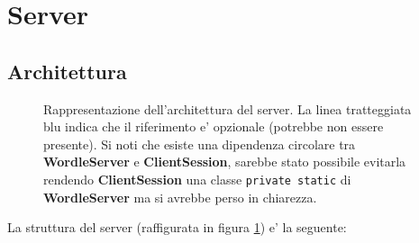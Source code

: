 \section{Server}

\subsection{Architettura}

\begin{center}
	\begin{figure}[t]
		\caption{Rappresentazione dell'architettura del server. La linea tratteggiata blu indica che il riferimento e' opzionale (potrebbe non essere presente). Si noti che esiste una dipendenza circolare tra \textbf{WordleServer} e \textbf{ClientSession}, sarebbe stato possibile evitarla rendendo \textbf{ClientSession} una classe \texttt{private static} di \textbf{WordleServer} ma si avrebbe perso in chiarezza.}
		\label{fig:server_arch}
	\end{figure}
\end{center}

La struttura del server (raffigurata in figura \ref{fig:server_arch}) e' la seguente:
\bigskip

